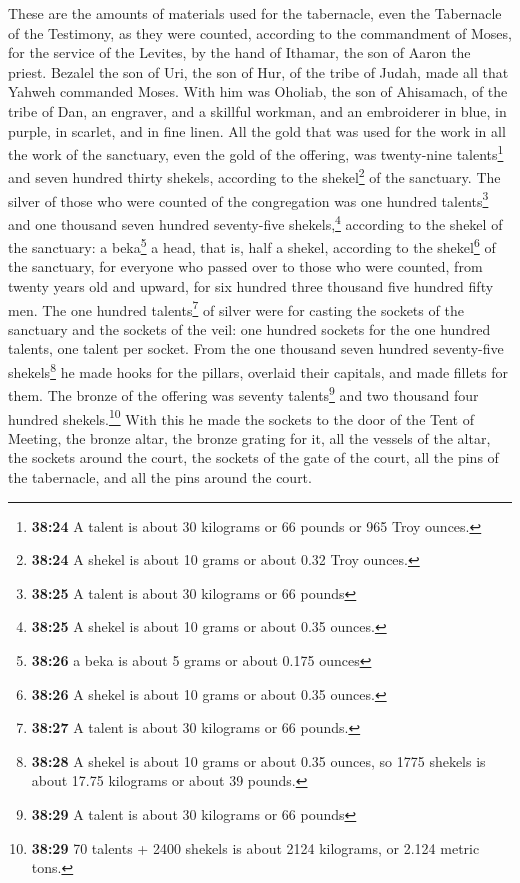  These are the amounts of materials used for the
tabernacle, even the Tabernacle of the Testimony, as they were counted,
according to the commandment of Moses, for the service of the Levites,
by the hand of Ithamar, the son of Aaron the priest. 
Bezalel the son of Uri, the son of Hur, of the tribe of Judah, made all
that Yahweh commanded Moses.  With him was Oholiab, the
son of Ahisamach, of the tribe of Dan, an engraver, and a skillful
workman, and an embroiderer in blue, in purple, in scarlet, and in fine
linen.  All the gold that was used for the work in all
the work of the sanctuary, even the gold of the offering, was
twenty-nine talents\footnote{\textbf{38:24} A talent is about 30
  kilograms or 66 pounds or 965 Troy ounces.} and seven hundred thirty
shekels, according to the shekel\footnote{\textbf{38:24} A shekel is
  about 10 grams or about 0.32 Troy ounces.} of the sanctuary.
 The silver of those who were counted of the congregation
was one hundred talents\footnote{\textbf{38:25} A talent is about 30
  kilograms or 66 pounds} and one thousand seven hundred seventy-five
shekels,\footnote{\textbf{38:25} A shekel is about 10 grams or about
  0.35 ounces.} according to the shekel of the sanctuary:
 a beka\footnote{\textbf{38:26} a beka is about 5 grams
  or about 0.175 ounces} a head, that is, half a shekel, according to
the shekel\footnote{\textbf{38:26} A shekel is about 10 grams or about
  0.35 ounces.} of the sanctuary, for everyone who passed over to those
who were counted, from twenty years old and upward, for six hundred
three thousand five hundred fifty men.  The one hundred
talents\footnote{\textbf{38:27} A talent is about 30 kilograms or 66
  pounds.} of silver were for casting the sockets of the sanctuary and
the sockets of the veil: one hundred sockets for the one hundred
talents, one talent per socket.  From the one thousand
seven hundred seventy-five shekels\footnote{\textbf{38:28} A shekel is
  about 10 grams or about 0.35 ounces, so 1775 shekels is about 17.75
  kilograms or about 39 pounds.} he made hooks for the pillars, overlaid
their capitals, and made fillets for them.  The bronze of
the offering was seventy talents\footnote{\textbf{38:29} A talent is
  about 30 kilograms or 66 pounds} and two thousand four hundred
shekels.\footnote{\textbf{38:29} 70 talents + 2400 shekels is about 2124
  kilograms, or 2.124 metric tons.}  With this he made
the sockets to the door of the Tent of Meeting, the bronze altar, the
bronze grating for it, all the vessels of the altar,  the
sockets around the court, the sockets of the gate of the court, all the
pins of the tabernacle, and all the pins around the court.

